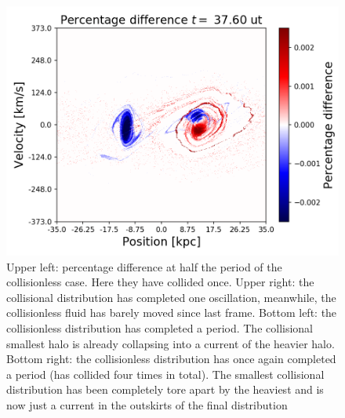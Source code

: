 {\begin{figure}[h!]
    \includegraphics[scale=0.45]{imag/diffBullet94.png}
    \caption{Upper left: percentage difference at half the period of the collisionless case. Here they have collided once. Upper right: the collisional distribution has completed one oscillation, meanwhile, the collisionless fluid has barely moved since last frame. Bottom left: the collisionless distribution has completed a period. The collisional smallest halo is already collapsing into a current of the heavier halo. Bottom right: the collisionless distribution has once again completed a period (has collided four times in total). The smallest collisional distribution has been completely tore apart by the heaviest and is now just a current in the outskirts of the final distribution }
        \label{colBulletPhase}
\end{figure}



\newpage
}
